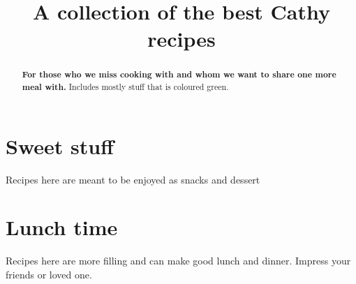 \documentclass[%
a4paper,
11pt
]{article}
\begin{document}
\title{A collection of the best \textbf{Cathy} recipes}
\maketitle

\begin{abstract}
    \noindent \textbf{For those who we miss cooking with and whom we want to share one more meal with.} Includes mostly stuff that is coloured green.
\end{abstract}

\tableofcontents

\pagebreak

\section{Sweet stuff}
Recipes here are meant to be enjoyed as snacks and dessert




\section{Lunch time}
Recipes here are more filling and can make good lunch and dinner. Impress your friends or loved one.



\end{document}
